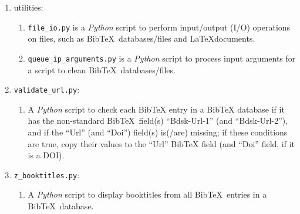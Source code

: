 \begin{enumerate}
\begin{enumerate}
	\item A {\it Python} script to display series from {\sc Bib}\TeX\ entries in a {\sc Bib}\TeX\ database.
	\end{enumerate}
\item utilities: \vspace{-0.3cm}
	\begin{enumerate} \itemsep -2pt
	\item {\tt file\_io.py} is a {\it Python} script to perform input/output (I/O) operations on files, such as {\sc Bib}\TeX\ databases/files and \LaTeX documents.
	\item {\tt queue\_ip\_arguments.py} is a {\it Python} script to process input arguments for a script to clean {\sc Bib}\TeX\ databases/files.
	\end{enumerate}
\item {\tt validate\_url.py}: \vspace{-0.3cm}
	\begin{enumerate} \itemsep -2pt
	\item A {\it Python} script to check each BibTeX entry in a BibTeX database if it has the non-standard {\sc Bib}\TeX\ field(s) ``Bdsk-Url-1'' (and ``Bdsk-Url-2''), and if the ``Url'' (and ``Doi'') field(s) is(/are) missing; if these conditions are true, copy their values to the ``Url'' BibTeX field (and ``Doi'' field, if it is a DOI).
	\end{enumerate}
\item {\tt z\_booktitles.py}: \vspace{-0.3cm}
	\begin{enumerate} \itemsep -2pt
	\item A {\it Python} script to display booktitles from all {\sc Bib}\TeX\ entries in a {\sc Bib}\TeX\ database.
	\end{enumerate}
\end{enumerate}

























